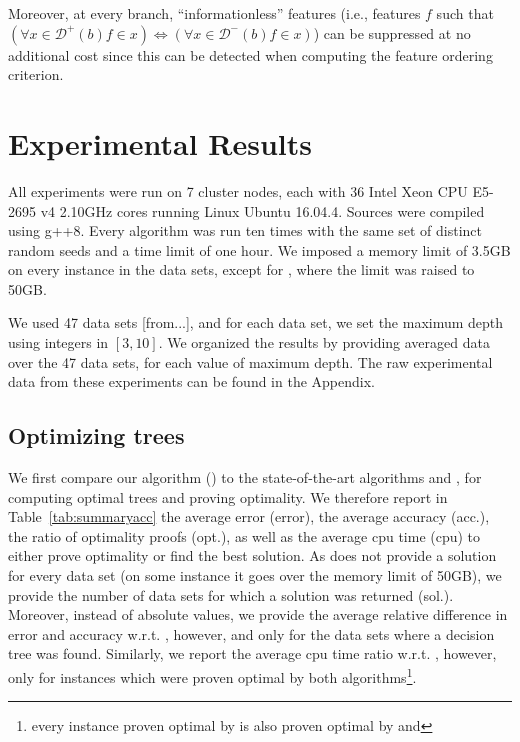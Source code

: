 \documentclass{llncs}
\def\posclass{+}
\def\negclass{-}
\def\datasymb{D}
\newcommand{\setex}[1]{\ensuremath{{\mathcal \datasymb}^{#1}}\xspace}
\newcommand{\posex}{{\setex{\posclass}}\xspace}
\newcommand{\negex}{{\setex{\negclass}}\xspace}
\newcommand{\afeat}[0]{\ensuremath{f}}
\newcommand{\abranch}[0]{\ensuremath{b}}
\begin{document}
Moreover, at every branch, ``informationless'' features (i.e., features $\afeat$ such that $(\forall x \in \posex(\abranch) \afeat \in x) \iff (\forall x \in \negex(\abranch) \afeat \in x)$) can be suppressed at no additional cost since this can be detected when computing the feature ordering criterion.




\section{Experimental Results}

All experiments were run
on 7 cluster nodes, each with 36 Intel Xeon CPU E5-2695 v4 2.10GHz cores
running Linux Ubuntu 16.04.4. Sources were compiled using g++8. 
Every algorithm was run ten times with the same set of distinct random seeds and a time limit of one hour. We imposed a memory limit of 3.5GB on every instance in the data sets, except for \dleight, where the limit was raised to 50GB.

We used 47 data sets [from...], and for each data set, we set the maximum depth using integers in $[3,10]$. We organized the results by providing averaged data over the 47 data sets, for each value of maximum depth.
The raw experimental data from these experiments can be found in the Appendix.



\subsection{Optimizing trees}

We first compare our algorithm (\budalg) to the state-of-the-art algorithms \murtree and \dleight, for computing optimal trees and proving optimality. We therefore report in Table~\ref{tab:summaryacc} the average error (error), the average accuracy (acc.), 
the ratio of optimality proofs (opt.), as well as the average cpu time (cpu) to either prove optimality or find the best solution.
As \dleight does not provide a solution for every data set (on some instance it goes over the memory limit of 50GB), we provide the number of data sets for which a solution was returned (sol.). Moreover, 
instead of absolute values, we provide the average relative difference in error and accuracy w.r.t. \budalg, however, and only for the data sets where a decision tree was found. Similarly, we report the average cpu time ratio w.r.t. \budalg, however, only for instances which were proven optimal by both algorithms\footnote{every instance proven optimal by \dleight is also proven optimal by \budalg and \murtree}.
\end{document}
